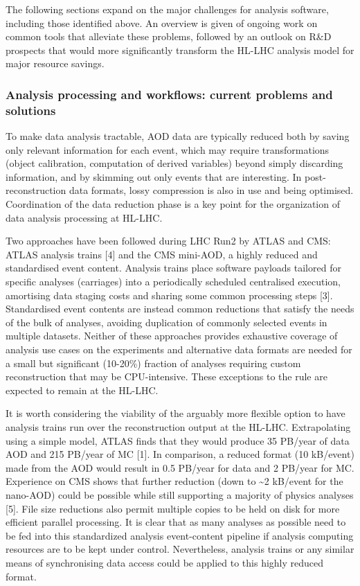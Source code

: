 \documentclass[11pt,a4paper]{article}
\begin{document}
The following sections expand on the major challenges for analysis
software, including those identified above. An overview is given of
ongoing work on common tools that alleviate these problems, followed by
an outlook on R\&D prospects that would more significantly transform the
HL-LHC analysis model for major resource savings.

\hypertarget{analysis-processing-and-workflows-current-problems-and-solutions}{%
\subsubsection{Analysis processing and workflows: current problems and
solutions}\label{analysis-processing-and-workflows-current-problems-and-solutions}}

To make data analysis tractable, AOD data are typically reduced both by
saving only relevant information for each event, which may require
transformations (object calibration, computation of derived variables)
beyond simply discarding information, and by skimming out only events
that are interesting. In post-reconstruction data formats, lossy
compression is also in use and being optimised. Coordination of the data
reduction phase is a key point for the organization of data analysis
processing at HL-LHC.

Two approaches have been followed during LHC Run2 by ATLAS and CMS:
ATLAS analysis trains {[}4{]} and the CMS mini-AOD, a highly reduced and
standardised event content. Analysis trains place software payloads
tailored for specific analyses (carriages) into a periodically scheduled
centralised execution, amortising data staging costs and sharing some
common processing steps {[}3{]}. Standardised event contents are instead
common reductions that satisfy the needs of the bulk of analyses,
avoiding duplication of commonly selected events in multiple datasets.
Neither of these approaches provides exhaustive coverage of analysis use
cases on the experiments and alternative data formats are needed for a
small but significant (10-20\%) fraction of analyses requiring custom
reconstruction that may be CPU-intensive. These exceptions to the rule
are expected to remain at the HL-LHC.

It is worth considering the viability of the arguably more flexible
option to have analysis trains run over the reconstruction output at the
HL-LHC. Extrapolating using a simple model, ATLAS finds that they would
produce 35 PB/year of data AOD and 215 PB/year of MC {[}1{]}. In
comparison, a reduced format (10 kB/event) made from the AOD would
result in 0.5 PB/year for data and 2 PB/year for MC. Experience on CMS
shows that further reduction (down to \textasciitilde2 kB/event for the
nano-AOD) could be possible while still supporting a majority of physics
analyses {[}5{]}. File size reductions also permit multiple copies to be
held on disk for more efficient parallel processing. It is clear that as
many analyses as possible need to be fed into this standardized analysis
event-content pipeline if analysis computing resources are to be kept
under control. Nevertheless, analysis trains or any similar means of
synchronising data access could be applied to this highly reduced
format.
\end{document}
